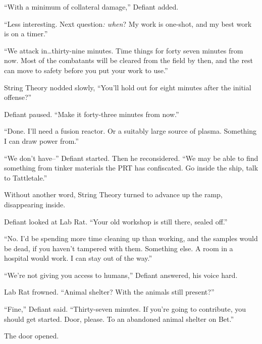 ``With a minimum of collateral damage,'' Defiant added.



``Less interesting.  Next question\emph{: when}?  My work is one-shot, and my best work is on a timer.''



``We attack in\ldots thirty-nine minutes.  Time things for forty seven minutes from now.  Most of the combatants will be cleared from the field by then, and the rest can move to safety before you put your work to use.''



String Theory nodded slowly, ``You'll hold out for eight minutes after the initial offense?''



Defiant paused.  ``Make it forty-three minutes from now.''



``Done.  I'll need a fusion reactor.  Or a suitably large source of plasma.  Something I can draw power from.''



``We don't have--'' Defiant started.  Then he reconsidered.  ``We may be able to find something from tinker materials the PRT has confiscated.  Go inside the ship, talk to Tattletale.''



Without another word, String Theory turned to advance up the ramp, disappearing inside.



Defiant looked at Lab Rat.  ``Your old workshop is still there, sealed off.''



``No.  I'd be spending more time cleaning up than working, and the samples would be dead, if you haven't tampered with them.  Something else.  A room in a hospital would work.  I can stay out of the way.''



``We're not giving you access to humans,'' Defiant answered, his voice hard.



Lab Rat frowned.  ``Animal shelter?  With the animals still present?''



``Fine,'' Defiant said.  ``Thirty-seven minutes.  If you're going to contribute, you should get started.  Door, please.  To an abandoned animal shelter on Bet.''



The door opened.



